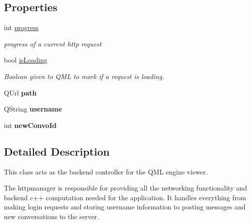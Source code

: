 \subsection*{Properties}
\begin{DoxyCompactItemize}
\item 
\hypertarget{classHttpManager_a090619732438afb63e0605bc1bb2d33f}{int \hyperlink{classHttpManager_a090619732438afb63e0605bc1bb2d33f}{progress}}\label{classHttpManager_a090619732438afb63e0605bc1bb2d33f}

\begin{DoxyCompactList}\small\item\em progress of a current http request \end{DoxyCompactList}\item 
bool \hyperlink{classHttpManager_aa2f331facd6aeaff68c6f424f10bbce5}{is\-Loading}
\begin{DoxyCompactList}\small\item\em Boolean given to Q\-M\-L to mark if a request is loading. \end{DoxyCompactList}\item 
\hypertarget{classHttpManager_aa32509947efe9fbdfd54b88516969af8}{Q\-Url {\bfseries path}}\label{classHttpManager_aa32509947efe9fbdfd54b88516969af8}

\item 
\hypertarget{classHttpManager_a7d7b4a614a7e7a7950710e16e3790638}{Q\-String {\bfseries username}}\label{classHttpManager_a7d7b4a614a7e7a7950710e16e3790638}

\item 
\hypertarget{classHttpManager_a5134e5011eab9ea4ee8c42dbc5f0426a}{int {\bfseries new\-Convo\-Id}}\label{classHttpManager_a5134e5011eab9ea4ee8c42dbc5f0426a}

\end{DoxyCompactItemize}


\subsection{Detailed Description}
This class acts as the backend controller for the Q\-M\-L engine viewer. 

The httpmanager is responsible for providing all the networking functionality and backend c++ computation needed for the application. It handles everything from making login requests and storing username information to posting messages and new conversations to the server. 

